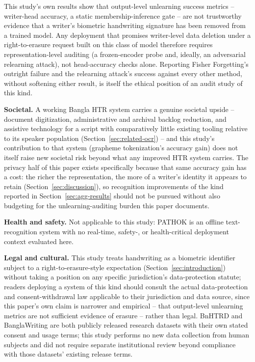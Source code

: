 \documentclass[a4paper,fleqn]{cas-dc}
\begin{document}
This study's own results show that output-level unlearning success metrics
-- writer-head accuracy, a static membership-inference gate -- are not
trustworthy evidence that a writer's biometric handwriting signature has
been removed from a trained model. Any deployment that promises
writer-level data deletion under a right-to-erasure request built on this
class of model therefore requires representation-level auditing (a
frozen-encoder probe and, ideally, an adversarial relearning attack), not
head-accuracy checks alone. Reporting Fisher Forgetting's outright failure
and the relearning attack's success against every other method, without
softening either result, is itself the ethical position of an audit study
of this kind.

\textbf{Societal.} A working Bangla HTR system carries a genuine societal
upside -- document digitization, administrative and archival backlog
reduction, and assistive technology for a script with comparatively
little existing tooling relative to its speaker population
(Section~\ref{sec:related-ocr}) -- and this study's contribution to that
system (grapheme tokenization's accuracy gain) does not itself raise new
societal risk beyond what any improved HTR system carries. The privacy
half of this paper exists specifically because that same accuracy gain
has a cost: the richer the representation, the more of a writer's
identity it appears to retain (Section~\ref{sec:discussion}), so
recognition improvements of the kind reported in
Section~\ref{sec:agg-results} should not be pursued without also
budgeting for the unlearning-auditing burden this paper documents.

\textbf{Health and safety.} Not applicable to this study: PATHOK is an
offline text-recognition system with no real-time, safety-, or
health-critical deployment context evaluated here.

\textbf{Legal and cultural.} This study treats handwriting as a
biometric identifier subject to a right-to-erasure-style expectation
(Section~\ref{sec:introduction}) without taking a position on any
specific jurisdiction's data-protection statute; readers deploying a
system of this kind should consult the actual data-protection and
consent-withdrawal law applicable to their jurisdiction and data source,
since this paper's own claim is narrower and empirical -- that
output-level unlearning metrics are not sufficient evidence of erasure --
rather than legal. BnHTRD and BanglaWriting are both publicly released
research datasets with their own stated consent and usage terms; this
study performs no new data collection from human subjects and did not
require separate institutional review beyond compliance with those
datasets' existing release terms.
\end{document}

